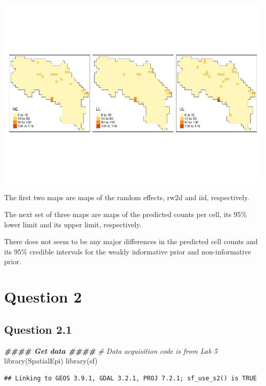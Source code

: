 \documentclass[
]{article}
\newenvironment{Shaded}{\begin{snugshade}}{\end{snugshade}}
\newcommand{\CommentTok}[1]{\textcolor[rgb]{0.56,0.35,0.01}{\textit{#1}}}
\newcommand{\DocumentationTok}[1]{\textcolor[rgb]{0.56,0.35,0.01}{\textbf{\textit{#1}}}}
\newcommand{\FunctionTok}[1]{\textcolor[rgb]{0.00,0.00,0.00}{#1}}
\newcommand{\NormalTok}[1]{#1}
\begin{document}
\includegraphics{hw4_files/figure-latex/unnamed-chunk-5-2.pdf}

The first two maps are maps of the random effects, rw2d and iid,
respectively.

The next set of three maps are maps of the predicted counts per cell,
its 95\% lower limit and its upper limit, respectively.

There does not seem to be any major differences in the predicted cell
counts and its 95\% credible intervals for the weakly informative prior
and non-informative prior.

\hypertarget{question-2}{%
\section{Question 2}\label{question-2}}

\hypertarget{question-2.1}{%
\subsection{Question 2.1}\label{question-2.1}}

\begin{Shaded}
\begin{Highlighting}[]
\DocumentationTok{\#\#\#\# Get data \#\#\#\#}
\CommentTok{\# Data acquisition code is from Lab 5}
\FunctionTok{library}\NormalTok{(SpatialEpi)}
\FunctionTok{library}\NormalTok{(sf)}
\end{Highlighting}
\end{Shaded}

\begin{verbatim}
## Linking to GEOS 3.9.1, GDAL 3.2.1, PROJ 7.2.1; sf_use_s2() is TRUE
\end{verbatim}
\end{document}
